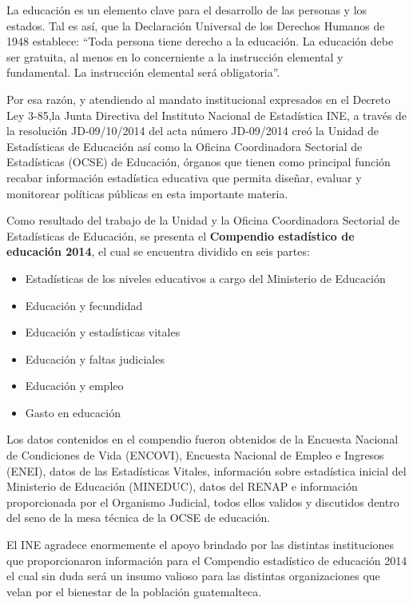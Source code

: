 $\ $\\[1cm]

\tableofcontents

\cleardoublepage
	\pagestyle{estandar}
	\setcounter{page}{1}
	\setlength{\arrayrulewidth}{1.0pt}





\cleardoublepage


$\ $\\[2cm]

 La educación es un elemento clave para el desarrollo de las personas y los estados. Tal es así, que la Declaración Universal de los Derechos Humanos de 1948 establece: “Toda persona tiene derecho a la educación. La educación debe ser gratuita, al menos en lo concerniente a la instrucción elemental y fundamental. La instrucción elemental será obligatoria”.
 
 Por esa razón, y atendiendo al mandato institucional expresados en el Decreto Ley 3-85,la Junta Directiva del Instituto Nacional de Estadística INE, a través de la resolución JD-09/10/2014 del acta número JD-09/2014 creó la Unidad de Estadísticas de Educación así como la Oficina Coordinadora Sectorial de Estadísticas (OCSE) de Educación, órganos que tienen como principal función recabar información estadística educativa que permita diseñar, evaluar y monitorear políticas públicas en esta importante materia.
 
 Como resultado del trabajo de la Unidad y la Oficina Coordinadora Sectorial de Estadísticas de Educación, se presenta el \textbf{Compendio estadístico de educación 2014}, el cual se encuentra dividido en seis partes:
 
\begin{itemize}
	\item Estadísticas de los niveles educativos a cargo del Ministerio de  Educación
	\item Educación y fecundidad
	\item Educación y estadísticas vitales
	\item Educación y faltas judiciales
	\item Educación y empleo
	\item Gasto en educación
\end{itemize}


Los datos contenidos en el compendio fueron obtenidos de la Encuesta Nacional de Condiciones de Vida (ENCOVI), Encuesta Nacional de Empleo e Ingresos (ENEI), datos de las Estadísticas Vitales, información sobre estadística inicial del Ministerio de Educación (MINEDUC), datos del RENAP e información proporcionada por el Organismo Judicial, todos ellos validos y discutidos dentro del seno de la mesa técnica de la OCSE de educación.

El INE agradece enormemente el apoyo brindado por las distintas instituciones que proporcionaron información para el Compendio estadístico de educación 2014 el cual sin duda será un insumo valioso para las distintas organizaciones que velan por el bienestar de la población guatemalteca.

\restoregeometry